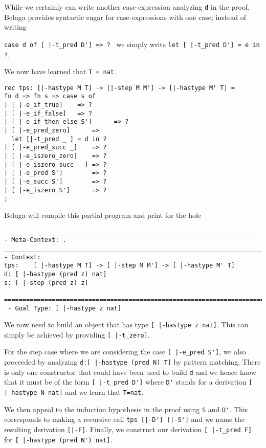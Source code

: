 While we certainly can write another case-expression analyzing
\lstinline!d! in the proof, Beluga provides syntactic sugar for
case-expressions with one case; instead of writing 

\noindent
\lstinline!case d of [ |-t_pred D'] => ? ! we simply write 
\lstinline!let [ |-t_pred D'] = e in ?!.


We now have learned that \lstinline!T = nat!.

\begin{lstlisting}
rec tps: [|-hastype M T] -> [|-step M M'] -> [|-hastype M' T] = 
fn d => fn s => case s of
| [ |-e_if_true]    => ? 
| [ |-e_if_false]   => ?
| [ |-e_if_then_else S']      => ?
| [ |-e_pred_zero]      => 
  let [|-t_pred _ ] = d in ?
| [ |-e_pred_succ _]    => ?
| [ |-e_iszero_zero]    => ?
| [ |-e_iszero_succ _ ] => ?
| [ |-e_pred S']        => ?
| [ |-e_succ S']        => ?
| [ |-e_iszero S']      => ?
;
\end{lstlisting}



Beluga will compile this partial program and print for the hole 

\begin{lstlisting}
________________________________________________________________________________
- Meta-Context: .
________________________________________________________________________________
- Context: 
tps:    [ |-hastype M T] -> [ |-step M M'] -> [ |-hastype M' T]
d: [ |-hastype (pred z) nat]
s: [ |-step (pred z) z]
                                            
================================================================================
 - Goal Type: [ |-hastype z nat]

\end{lstlisting}



We now need to build an object that has type 
\lstinline![ |-hastype z nat]!. This can simply be achieved by
providing 
\lstinline![ |-t_zero]!.


For the step case where we are considering the case 
\lstinline![ |-e_pred S']!, we also proceeded by analyzing 
\lstinline!d:[ |-hastype (pred N) T]! by pattern matching. There is
only one constructor that could have been used to build \lstinline!d!
and we hence know that it must be of the form 
\lstinline![ |-t_pred D']! where \lstinline!D'! stands for a
derivation
\lstinline![ |-hastype N nat]! and we learn that \lstinline!T=nat!.

We then appeal to the induction hypothesis in the proof
using \lstinline!S! and \lstinline!D'!. This corresponds to making a
recursive call \lstinline!tps [|-D'] [|-S']! and we name the resulting
derivation \lstinline![|-F]!. Finally, we construct our derivation
\lstinline![ |-t_pred F]! for \lstinline![ |-hastype (pred N') nat]!.

